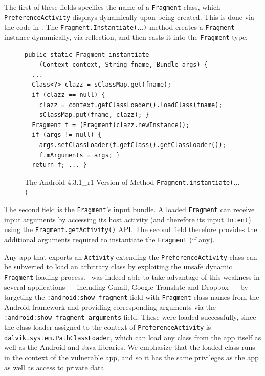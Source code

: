 The first of these fields specifies the name 
of a \texttt{Fragment} class, which \texttt{PreferenceActivity}
displays dynamically upon being created. This is done via the code in . The {\tt Fragment.Instantiate($\ldots$)} method creates a {\tt Fragment} instance dynamically, via reflection, and then
casts it into the {\tt Fragment} type.

\begin{figure}[H]
\begin{lstlisting}[showstringspaces=false]
public static Fragment instantiate
    (Context context, String fname, Bundle args) {
  ...
  Class<?> clazz = sClassMap.get(fname);
  if (clazz == null) {
    clazz = context.getClassLoader().loadClass(fname);
    sClassMap.put(fname, clazz); }
  Fragment f = (Fragment)clazz.newInstance();
  if (args != null) {
    args.setClassLoader(f.getClass().getClassLoader());
    f.mArguments = args; }
  return f; ... }
\end{lstlisting}
\caption{The Android 4.3.1\_r1 Version of Method \texttt{Fragment.instantiate($\ldots$)}}\label{Fi:FragmentInstantiate}
\end{figure}

The second field is the \texttt{Fragment}'s input bundle. A loaded \texttt{Fragment} can
receive input arguments by accessing its host activity (and therefore
its input \texttt{Intent}) using the \texttt{Fragment.getActivity()} API. The second field therefore provides the additional arguments required to instantiate the {\tt Fragment} (if any).

Any app that exports an {\tt Activity} extending the {\tt PreferenceActivity} class can be subverted to load an arbitrary class
by exploiting the unsafe dynamic {\tt Fragment} loading process. \Tool\ was indeed able to take advantage of this weakness
in several applications --- including Gmail, Google Translate and Dropbox --- by
targeting the \texttt{:android:show\_fragment}  field with {\tt Fragment} class names from the Android framework and providing corresponding arguments via the \texttt{:android:show\_fragment\_arguments} field. These were loaded successfully, since
the class loader assigned to the context of \texttt{PreferenceActivity} is
\texttt{dalvik.system.PathClassLoader}, which can load any class from the app itself as well as the Android and Java libraries.
We emphasize that the loaded class runs in the context of the vulnerable app, and so it has the same
privileges as the app as well as access to private data. 

